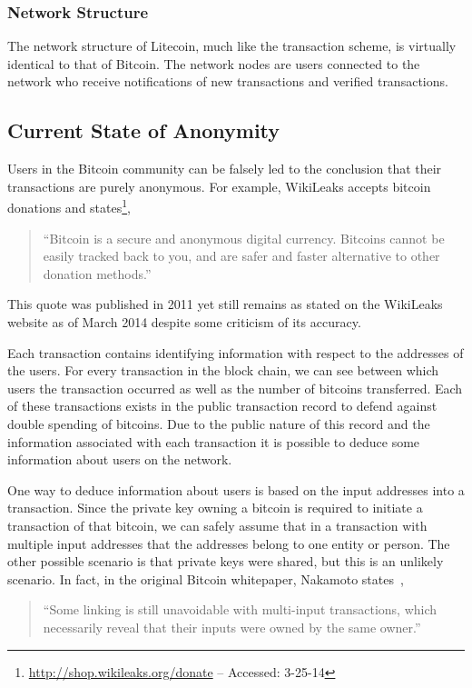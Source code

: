 \documentclass[11pt]{article}
\begin{document}
\subsubsection{Network Structure}
The network structure of Litecoin, much like the transaction scheme, is
virtually identical to that of Bitcoin. The network nodes are users connected to
the network who receive notifications of new transactions and verified
transactions.

\subsection{Current State of Anonymity}
Users in the Bitcoin community can be falsely led to the conclusion that their
transactions are purely anonymous. For example, WikiLeaks accepts bitcoin
donations and states\footnote{\url{http://shop.wikileaks.org/donate} --
Accessed: 3-25-14},
\begin{quote}
``Bitcoin is a secure and anonymous digital currency. Bitcoins cannot be easily
tracked back to you, and are safer and faster alternative to other donation
methods.''
\end{quote}
This quote was published in 2011 yet still remains as stated on the WikiLeaks
website as of March 2014 despite some criticism of its accuracy.

Each transaction contains identifying information with respect to the addresses
of the users. For every transaction in the block chain, we can see between which
users the transaction occurred as well as the number of bitcoins transferred.
Each of these transactions exists in the public transaction record to defend
against double spending of bitcoins. Due to the public nature of this record and
the information associated with each transaction it is possible to deduce some
information about users on the network.

One way to deduce information about users is based on the input addresses into a
transaction. Since the private key owning a bitcoin is required to initiate a
transaction of that bitcoin, we can safely assume that in a transaction
with multiple input addresses that the addresses belong to one
entity or person. The other possible scenario is that private keys were shared,
but this is an unlikely scenario. In fact, in the original Bitcoin whitepaper,
Nakamoto states~\cite{nakamoto08},
\begin{quote}
``Some linking is still unavoidable with multi-input
transactions, which necessarily reveal that their inputs were owned by the same
owner.''
\end{quote}
\end{document}
